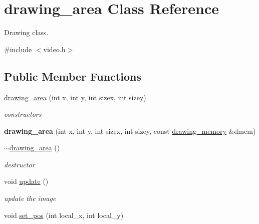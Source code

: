 \hypertarget{classdrawing__area}{}\section{drawing\+\_\+area Class Reference}
\label{classdrawing__area}


Drawing class.  




{\ttfamily \#include $<$video.\+h$>$}

\subsection*{Public Member Functions}
\begin{DoxyCompactItemize}
\item 
\hypertarget{classdrawing__area_a9c0c8c54e9d23463e174b05500f0abd2}{}\hyperlink{classdrawing__area_a9c0c8c54e9d23463e174b05500f0abd2}{drawing\+\_\+area} (int x, int y, int sizex, int sizey)\label{classdrawing__area_a9c0c8c54e9d23463e174b05500f0abd2}

\begin{DoxyCompactList}\small\item\em constructors \end{DoxyCompactList}\item 
\hypertarget{classdrawing__area_acfcca3d2ff3015fc87035f398ba0f12f}{}{\bfseries drawing\+\_\+area} (int x, int y, int sizex, int sizey, const \hyperlink{classdrawing__memory}{drawing\+\_\+memory} \&dmem)\label{classdrawing__area_acfcca3d2ff3015fc87035f398ba0f12f}

\item 
\hypertarget{classdrawing__area_a881d4aec2f69e94a62aee40af645bb99}{}\hyperlink{classdrawing__area_a881d4aec2f69e94a62aee40af645bb99}{$\sim$drawing\+\_\+area} ()\label{classdrawing__area_a881d4aec2f69e94a62aee40af645bb99}

\begin{DoxyCompactList}\small\item\em destructor \end{DoxyCompactList}\item 
\hypertarget{classdrawing__area_a3bce4fb6daed7d9cd31246096e5e55a2}{}void \hyperlink{classdrawing__area_a3bce4fb6daed7d9cd31246096e5e55a2}{update} ()\label{classdrawing__area_a3bce4fb6daed7d9cd31246096e5e55a2}

\begin{DoxyCompactList}\small\item\em update the image \end{DoxyCompactList}\item 
\hypertarget{classdrawing__area_a75001db2c7b8a610ee00b8017b117abb}{}void \hyperlink{classdrawing__area_a75001db2c7b8a610ee00b8017b117abb}{set\+\_\+pos} (int local\+\_\+x, int local\+\_\+y)\label{classdrawing__area_a75001db2c7b8a610ee00b8017b117abb}


\end{DoxyCompactItemize}
